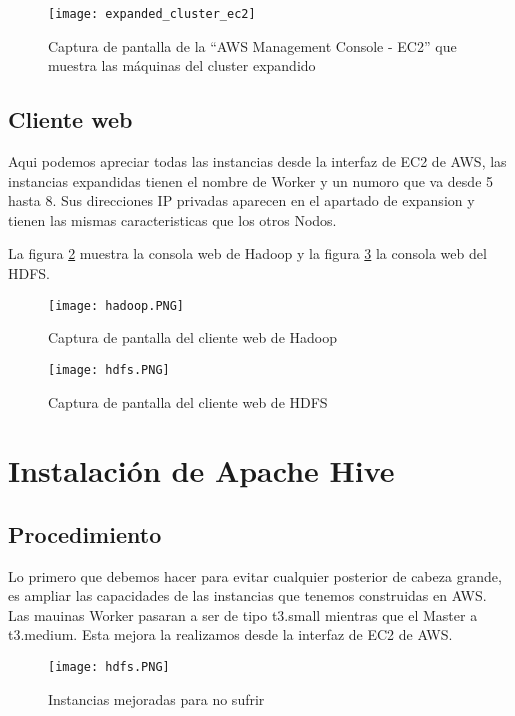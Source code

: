 \documentclass[9pt,letterpaper,twoside]{article}
\begin{document}
\begin{figure}
    \centering
    \texttt{[image: expanded\_cluster\_ec2]}
    \caption{Captura de pantalla de la ``AWS Management Console - EC2'' que muestra las máquinas del cluster expandido}
    \label{expanded_cluster_ec2}
\end{figure}

\newpage

\subsection{Cliente web}

Aqui podemos apreciar todas las instancias desde la interfaz de EC2 de AWS, las instancias expandidas tienen el nombre de Worker
y un numoro que va desde 5 hasta 8. Sus direcciones IP privadas aparecen en el apartado de expansion y tienen las mismas
caracteristicas que los otros Nodos.

La figura \ref{hadoop.PNG} muestra la consola web de Hadoop y la figura \ref{hdfs.PNG} la consola web del HDFS.

\begin{figure}
    \centering
    \texttt{[image: hadoop.PNG]}
    \caption{Captura de pantalla del cliente web de Hadoop}
    \label{hadoop.PNG}
\end{figure}

\begin{figure}
    \centering
    \texttt{[image: hdfs.PNG]}
    \caption{Captura de pantalla del cliente web de HDFS}
    \label{hdfs.PNG}
\end{figure}

\newpage

\section{Instalación de Apache Hive}

\subsection{Procedimiento}

\noindent
Lo primero que debemos hacer para evitar cualquier posterior de cabeza grande, es ampliar
las capacidades de las instancias que tenemos construidas en AWS. Las mauinas Worker pasaran
a ser de tipo t3.small mientras que el Master a t3.medium. Esta mejora la realizamos desde
la interfaz de EC2 de AWS.

\begin{figure}
    \centering
    \texttt{[image: hdfs.PNG]}
    \caption{Instancias mejoradas para no sufrir}
    \label{9-mejorar_los_nodos.png}
\end{figure}
\end{document}
